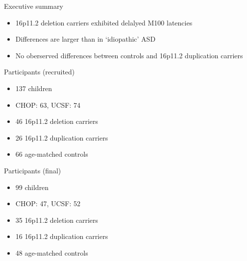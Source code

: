 \begin{frame}{Executive summary}

\begin{itemize}
\itemsep1pt\parskip0pt
\item
  16p11.2 deletion carriers exhibited delalyed M100 latencies\\
\item
  Differences are larger than in `idiopathic' ASD\\
\item
  No oberserved differences between controls and 16p11.2 duplication
  carriers
\end{itemize}

\end{frame}

\begin{frame}{Participants (recruited)}

\begin{itemize}
\itemsep1pt\parskip0pt
\item
  137 children\\
\item
  CHOP: 63, UCSF: 74
\item
  46 16p11.2 deletion carriers\\
\item
  26 16p11.2 duplication carriers\\
\item
  66 age-matched controls
\end{itemize}

\end{frame}

\begin{frame}{Participants (final)}

\begin{itemize}
\itemsep1pt\parskip0pt
\item
  99 children\\
\item
  CHOP: 47, UCSF: 52\\
\item
  35 16p11.2 deletion carriers\\
\item
  16 16p11.2 duplication carriers\\
\item
  48 age-matched controls
\end{itemize}

\end{frame}

